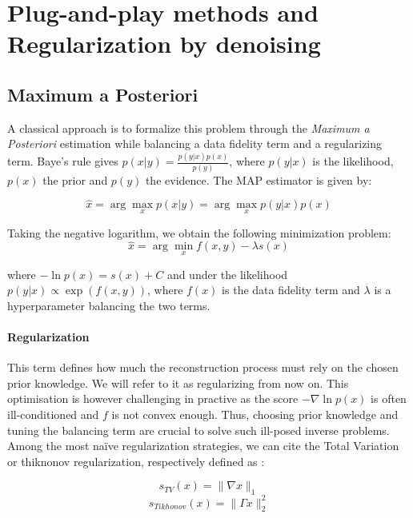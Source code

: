 \section{Plug-and-play methods and Regularization by denoising}

\subsection{Maximum a Posteriori}
A classical approach is to formalize this problem through the \textit{Maximum a Posteriori} estimation while balancing a data fidelity term and a regularizing term. Baye's rule gives $p(x|y) = \frac{p(y|x)p(x)}{p(y)}$, where $p(y|x)$ is the likelihood, $p(x)$ the prior and $p(y)$ the evidence. The MAP estimator is given by:

\begin{equation}
    \hat{x} = \arg \max_x p(x|y) = \arg \max_x p(y|x)p(x)
\end{equation}

Taking the negative logarithm, we obtain the following minimization problem:
\begin{equation}
    \hat{x} = \arg \min_x f(x, y) - \lambda s(x)
\end{equation}

where $-\ln p(x) = s(x) + C$ and under the likelihood  $p(y | x) \propto \exp(f(x, y))$, where $f(x)$ is the data fidelity term and $\lambda$ is a hyperparameter balancing the two terms.

\paragraph{Regularization}
This term defines how much the reconstruction process must rely on the chosen prior knowledge. We will refer to it as regularizing from now on.
This optimisation is however challenging in practive as the score $-\nabla \ln p(x)$ is often ill-conditioned and $f$ is not convex enough.
Thus, choosing prior knowledge and tuning the balancing term are crucial to solve such ill-posed inverse problems.
Among the most naïve regularization strategies, we can cite the Total Variation or thiknonov regularization, respectively defined as :

\begin{equation}
    s_{TV}(x) = \|\nabla x\|_1
\end{equation} 
\begin{equation}
    s_{Tikhonov}(x) = \|\Gamma x\|_2^2
\end{equation}

